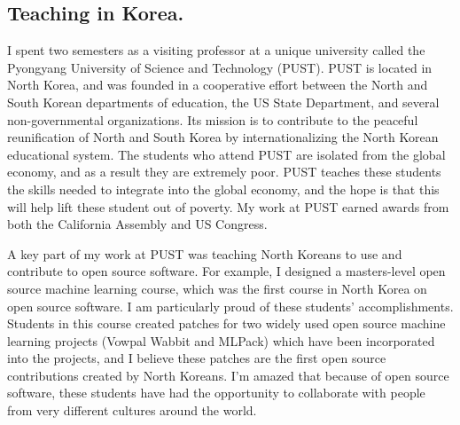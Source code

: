 \documentclass[12pt]{article}
\begin{document}
\vspace{-0.15in}
\subsection*{Teaching in Korea.}
I spent two semesters as a visiting professor at a unique university called the Pyongyang University of Science and Technology (PUST). 
PUST is located in North Korea, 
and was founded in a cooperative effort between the North and South Korean departments of education, the US State Department, and several non-governmental organizations.
Its mission is to contribute to the peaceful reunification of North and South Korea by internationalizing the North Korean educational system.
The students who attend PUST are isolated from the global economy,
and as a result they are extremely poor.
PUST teaches these students the skills needed to integrate into the global economy,
and the hope is that this will help lift these student out of poverty.
My work at PUST earned awards from both the California Assembly and US Congress.

A key part of my work at PUST was teaching North Koreans to use and contribute to open source software.
For example, I designed a masters-level open source machine learning course,
which was the first course in North Korea on open source software. 
I am particularly proud of these students' accomplishments.
Students in this course created patches for two widely used open source machine learning projects (Vowpal Wabbit and MLPack) which have been incorporated into the projects,
and I believe these patches are the first open source contributions created by North Koreans.
I'm amazed that because of open source software, these students have had the opportunity to collaborate with people from very different cultures around the world.
\end{document}
